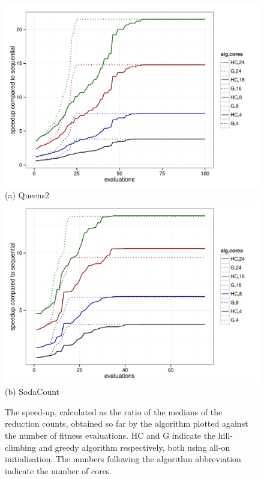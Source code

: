 \begin{figure}[H]
\centering
\includegraphics[scale=0.75]{Blind/Figures/speedup_by_evals_Queens2_allon_median.pdf}\\
(a) Queens2\\
\includegraphics[scale=0.75]{Blind/Figures/speedup_by_evals_SodaCount_allon_median.pdf}\\
(b) SodaCount\\
\caption[Speedups against number of fitness evaluations for \texttt{Queens2} and \texttt{SodaCount}]{The speed-up, calculated as the ratio of the medians of the reduction counts, obtained so far by the algorithm plotted against the number of fitness evaluations. HC and G indicate the hill-climbing and greedy algorithm respectively, both using all-on initialisation. The numbers following the algorithm abbreviation indicate the number of cores.}
\label{fig:evals}
\end{figure}

